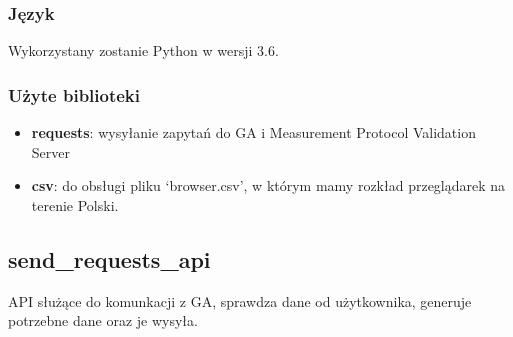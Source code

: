 \documentclass{article}
\begin{document}
\subsubsection{Język}

Wykorzystany zostanie Python w wersji 3.6.

\subsubsection{Użyte biblioteki}

\begin{itemize}
\item \textbf{requests}: wysyłanie zapytań do GA i Measurement Protocol Validation Server
\item \textbf{csv}: do obsługi pliku `browser.csv', w którym mamy rozkład przeglądarek na terenie Polski.
\end{itemize}

\subsection{send\_requests\_api}
API służące do komunkacji z GA, sprawdza dane od użytkownika, generuje potrzebne dane oraz je wysyła.
\end{document}
